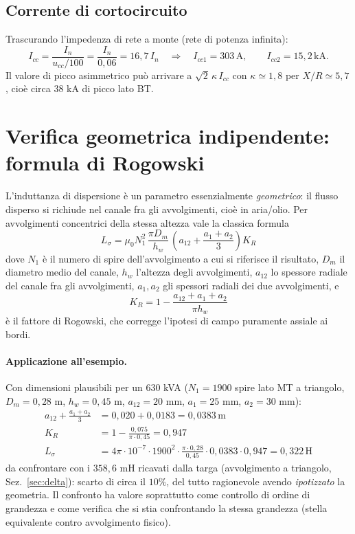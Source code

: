 \documentclass[11pt,a4paper]{article}
\newcommand{\un}[1]{\,\mathrm{#1}}
\begin{document}
\subsection*{Corrente di cortocircuito}
Trascurando l'impedenza di rete a monte (rete di potenza infinita):
\begin{equation}
I_{cc} = \frac{I_n}{u_{cc}/100} = \frac{I_n}{0{,}06} = 16{,}7\,I_n
\quad\Rightarrow\quad
I_{cc1}=303\un{A},\qquad I_{cc2}=15{,}2\un{kA}.
\end{equation}
Il valore di picco asimmetrico può arrivare a $\sqrt2\,\kappa\,I_{cc}$ con
$\kappa\simeq1{,}8$ per $X/R\simeq 5{,}7$, cioè circa $38$ kA di picco lato BT.

\section{Verifica geometrica indipendente: formula di Rogowski}

L'induttanza di dispersione è un parametro essenzialmente \emph{geometrico}: il flusso
disperso si richiude nel canale fra gli avvolgimenti, cioè in aria/olio. Per avvolgimenti
concentrici della stessa altezza vale la classica formula
\begin{equation}
\boxed{\;L_{\sigma} = \mu_0 N_1^2 \,\frac{\pi D_m}{h_w}\,
\left(a_{12} + \frac{a_1+a_2}{3}\right) K_R \;}
\label{eq:rogowski}
\end{equation}
dove $N_1$ è il numero di spire dell'avvolgimento a cui si riferisce il risultato,
$D_m$ il diametro medio del canale, $h_w$ l'altezza degli avvolgimenti, $a_{12}$ lo
spessore radiale del canale fra gli avvolgimenti, $a_1,a_2$ gli spessori radiali dei due
avvolgimenti, e
\begin{equation}
K_R = 1 - \frac{a_{12}+a_1+a_2}{\pi h_w}
\end{equation}
è il fattore di Rogowski, che corregge l'ipotesi di campo puramente assiale ai bordi.

\paragraph{Applicazione all'esempio.} Con dimensioni plausibili per un 630 kVA
($N_1 = 1900$ spire lato MT a triangolo, $D_m = 0{,}28$ m, $h_w = 0{,}45$ m,
$a_{12}=20$ mm, $a_1=25$ mm, $a_2=30$ mm):
\begin{align}
a_{12}+\frac{a_1+a_2}{3} &= 0{,}020 + 0{,}0183 = 0{,}0383\un{m}\\
K_R &= 1-\frac{0{,}075}{\pi\cdot0{,}45} = 0{,}947\\
L_\sigma &= 4\pi\!\cdot\!10^{-7}\cdot 1900^2\cdot\frac{\pi\cdot0{,}28}{0{,}45}\cdot
0{,}0383\cdot 0{,}947 = 0{,}322\un{H}
\end{align}
da confrontare con i $358{,}6$ mH ricavati dalla targa (avvolgimento a triangolo,
Sez.~\ref{sec:delta}): scarto di circa il $10\%$, del tutto ragionevole avendo
\emph{ipotizzato} la geometria. Il confronto ha valore soprattutto come controllo di
ordine di grandezza e come verifica che si stia confrontando la stessa grandezza (stella
equivalente contro avvolgimento fisico).
\end{document}

